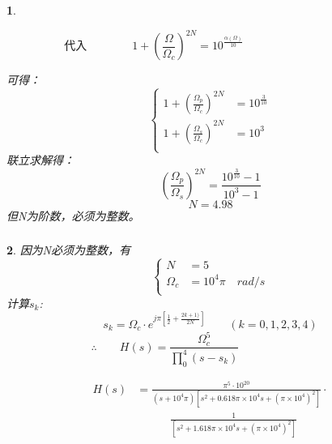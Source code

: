 \documentclass[notheorems,compress,mathserif,table]{beamer}
\newtheorem{dablock}{}
\begin{document}
\begin{frame}[shrink]\frametitle{}%
\begin{dablock}
        \begin{flushleft}
        $$\mbox{代入}\quad\quad\quad\quad
        1+(\frac{\Omega}{\Omega_{c}})^{2N}=10^{\frac{\alpha(\Omega)}{10}}
        \quad\quad\quad\quad\quad\quad\quad\quad\quad\quad$$
        \end{flushleft}
        可得：
        $$
        \left\{ \begin{aligned}
            1+(\frac{\Omega_{p}}{\Omega_{c}})^{2N} &= 10^{\frac{3}{10}}\\
            1+(\frac{\Omega_{s}}{\Omega_{c}})^{2N} &= 10^{3}\\
        \end{aligned} \right.
        $$
        联立求解得：
        $$(\frac{\Omega_{p}}{\Omega_{s}})^{2N} = \frac{10^{\frac{3}{10}}-1}{10^{3}-1}$$
        $$\mbox{$N=4.98$}$$
        但N为阶数，必须为整数。
\end{dablock}
\end{frame}
%
%
\begin{frame}[shrink]\frametitle{}%
\begin{dablock}
因为N必须为整数，有
$$
\left\{ \begin{aligned}
N          &= 5\\
\Omega_{c} &= 10^{4}\pi\quad rad/s\\
\end{aligned} \right.
$$
计算$s_k$:
$$s_{k}=\Omega_{c}\cdot e^{j\pi[\frac{1}{2}+\frac{2k+1)}{2N}]} \qquad (k=0,1,2,3,4)$$
$$\therefore\quad\quad H(s)= \frac{\Omega^{5}_{c}}{\prod^4_{0}(s-s_k)}\qquad\qquad\qquad\qquad$$

\begin{equation*}
\begin{split}
  H(s) &=     \frac{\pi^{5}\cdot 10^{20}}{(s+10^4\pi)[s^2+0.618\pi\times10^4s+(\pi\times10^4)^2]}\cdot \\
       &\quad \quad\quad\frac{1}{[s^2+1.618\pi\times10^4s+(\pi\times10^4)^2]}
\end{split}
\end{equation*}
\end{dablock}
\end{frame}
\end{document}
